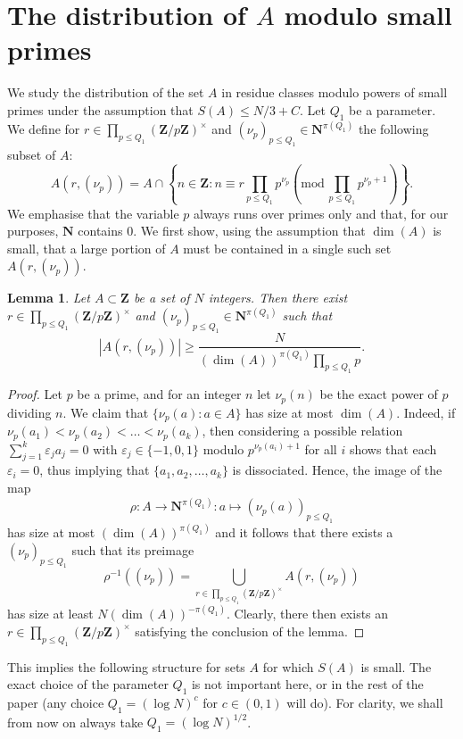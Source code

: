 \documentclass[11pt, reqno]{amsart}
\newtheorem{lemma}[theorem]{Lemma}
\newcommand{\md}[1]{\ensuremath{(\mbox{mod}\, #1)}}
\begin{document}
\section{The distribution of $A$ modulo small primes
}We study the distribution of the set $A$ in residue classes modulo powers of small primes under the assumption that $S(A)\leqslant N/3+C$. Let $Q_1$ be a parameter. We define for $r\in \prod_{p\leqslant Q_1}\left(\mathbf{Z}/p\mathbf{Z}\right)^\times$ and $(\nu_p)_{p\leqslant Q_1}\in\mathbf{N}^{\pi(Q_1)}$ the following subset of $A$:
\begin{equation*}
    A(r,(\nu_p))=A\cap\left\{n\in\mathbf{Z}: n\equiv r\prod_{p\leqslant Q_1}p^{\nu_p} \md {\prod_{p\leqslant Q_1}p^{\nu_p+1}}\right\}.
\end{equation*}
We emphasise that the variable $p$ always runs over primes only and that, for our purposes, $\mathbf{N}$ contains 0.
We first show, using the assumption that $\dim(A)$ is small, that a large portion of $A$ must be contained in a single such set $A(r,(\nu_p))$.
\begin{lemma}\label{lem:largeresidueclass}
    Let $A\subset\mathbf{Z}$ be a set of $N$ integers. Then there exist $r\in \prod_{p\leqslant Q_1}\left(\mathbf{Z}/p\mathbf{Z}\right)^\times$ and $(\nu_p)_{p\leqslant Q_1}\in\mathbf{N}^{\pi(Q_1)}$ such that $$|A(r,(\nu_p))|\geqslant \frac{N}{(\dim(A))^{\pi(Q_1)}\prod_{p\leqslant Q_1}p}.$$
\end{lemma}
\begin{proof}
    Let $p$ be a prime, and for an integer $n$ let $\nu_p(n)$ be the exact power of $p$ dividing $n$. We claim that $\{\nu_p(a):a\in A\}$ has size at most $\dim(A)$. Indeed, if $\nu_p(a_1)<\nu_p(a_2)<\dots<\nu_p(a_k)$, then considering a possible relation $\sum_{j=1}^k\varepsilon_ja_j=0$ with $\varepsilon_j\in\{-1,0,1\}$ modulo $p^{\nu_p(a_i)+1}$ for all $i$ shows that each $\varepsilon_i=0$, thus implying that $\{a_1,a_2,\dots,a_k\}$ is dissociated. Hence, the image of the map
    $$\rho:A\to\mathbf{N}^{\pi(Q_1)}:a\mapsto(\nu_p(a))_{p\leqslant Q_1}$$
    has size at most $(\dim(A))^{\pi(Q_1)}$ and it follows that there exists a $(\nu_p)_{p\leqslant Q_1}$ such that its preimage $$\rho^{-1}((\nu_p))=\bigcup_{r\in \prod_{p\leqslant Q_1}\left(\mathbf{Z}/p\mathbf{Z}\right)^\times}A(r,(\nu_p))$$
    has size at least $N(\dim(A))^{-\pi(Q_1)}$. Clearly, there then exists an $r\in \prod_{p\leqslant Q_1}\left(\mathbf{Z}/p\mathbf{Z}\right)^\times$ satisfying the conclusion of the lemma.
\end{proof}
This implies the following structure for sets $A$ for which $S(A)$ is small. The exact choice of the parameter $Q_1$ is not important here, or in the rest of the paper (any choice $Q_1=(\log N)^c$ for $c\in(0,1)$ will do). For clarity, we shall from now on always take $Q_1=(\log N)^{1/2}$.
\end{document}
